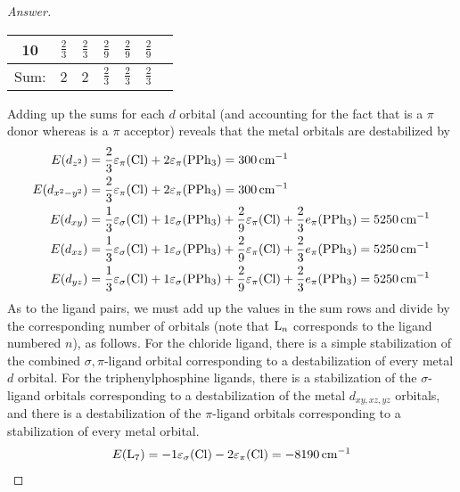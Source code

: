 \documentclass[../psets.tex]{subfiles}
\begin{document}
\begin{enumerate}[label={\Roman*)}]
\begin{enumerate}[label={\textbf{10.\arabic*}}]
\begin{proof}[Answer]
\begin{center}
\begin{tabular}{c|cccccc}
                    10 & $\frac{2}{3}$ & $\frac{2}{3}$ & $\frac{2}{9}$ & $\frac{2}{9}$ & $\frac{2}{9}$\\
                    \hline
                    Sum: & 2 & 2 & $\frac{2}{3}$ & $\frac{2}{3}$ & $\frac{2}{3}$\\
                \end{tabular}
            \end{center}
            Adding up the sums for each $d$ orbital (and accounting for the fact that  is a $\pi$ donor whereas  is a $\pi$ acceptor) reveals that the metal orbitals are destabilized by
            \begingroup
            \allowdisplaybreaks
            \begin{align*}
                E(d_{z^2}) &= \frac{2}{3}\varepsilon_\pi(\ce{Cl})+2\varepsilon_\pi(\ce{PPh3}) = \SI{300}{\per\centi\meter}\\
                E(d_{x^2-y^2}) &= \frac{2}{3}\varepsilon_\pi(\ce{Cl})+2\varepsilon_\pi(\ce{PPh3}) = \SI{300}{\per\centi\meter}\\
                E(d_{xy}) &= \frac{1}{3}\varepsilon_\sigma(\ce{Cl})+1\varepsilon_\sigma(\ce{PPh3})+\frac{2}{9}\varepsilon_\pi(\ce{Cl})+\frac{2}{3}e_\pi(\ce{PPh3}) = \SI{5250}{\per\centi\meter}\\
                E(d_{xz}) &= \frac{1}{3}\varepsilon_\sigma(\ce{Cl})+1\varepsilon_\sigma(\ce{PPh3})+\frac{2}{9}\varepsilon_\pi(\ce{Cl})+\frac{2}{3}e_\pi(\ce{PPh3}) = \SI{5250}{\per\centi\meter}\\
                E(d_{yz}) &= \frac{1}{3}\varepsilon_\sigma(\ce{Cl})+1\varepsilon_\sigma(\ce{PPh3})+\frac{2}{9}\varepsilon_\pi(\ce{Cl})+\frac{2}{3}e_\pi(\ce{PPh3}) = \SI{5250}{\per\centi\meter}
            \end{align*}
            \endgroup
            As to the ligand pairs, we must add up the values in the sum rows and divide by the corresponding number of orbitals (note that $\ce{L}_n$ corresponds to the ligand numbered $n$), as follows. For the chloride ligand, there is a simple stabilization of the combined $\sigma,\pi$-ligand orbital corresponding to a destabilization of every metal $d$ orbital. For the triphenylphosphine ligands, there is a stabilization of the $\sigma$-ligand orbitals corresponding to a destabilization of the metal $d_{xy,xz,yz}$ orbitals, and there is a destabilization of the $\pi$-ligand orbitals corresponding to a stabilization of every metal orbital.
            \begin{align*}
                E(\ce{L}_7) &= -1\varepsilon_\sigma(\ce{Cl})-2\varepsilon_\pi(\ce{Cl}) = \SI{-8190}{\per\centi\meter}\\

\end{align*}
\end{proof}
\end{enumerate}
\end{enumerate}
\end{document}
